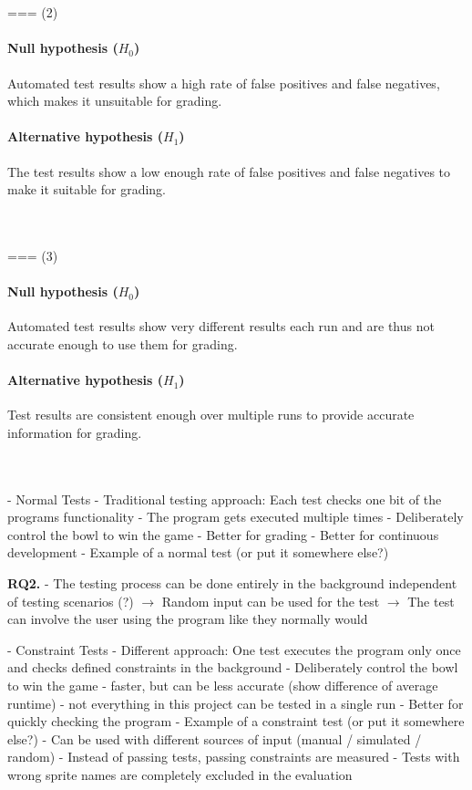 ~\\~\\
=== (2)
\paragraph{Null hypothesis ($H_0$)}
Automated test results show a high rate of false positives and false negatives, which makes it unsuitable for grading.
\paragraph{Alternative hypothesis ($H_1$)}
The test results show a low enough rate of false positives and false negatives to make it suitable for grading.

~\\~\\
=== (3)
\paragraph{Null hypothesis ($H_0$)}
Automated test results show very different results each run and are thus not accurate enough to use them for grading.
\paragraph{Alternative hypothesis ($H_1$)}
Test results are consistent enough over multiple runs to provide accurate information for grading.

~\\~\\
- Normal Tests
    - Traditional testing approach: Each test checks one bit of the programs functionality
    - The program gets executed multiple times
    - Deliberately control the bowl to win the game
    - Better for grading
    - Better for continuous development
    - Example of a normal test (or put it somewhere else?)

\textbf{RQ2.}
- The testing process can be done entirely in the background independent of testing scenarios (?)
    $\rightarrow$ Random input can be used for the test
    $\rightarrow$ The test can involve the user using the program like they normally would

- Constraint Tests
    - Different approach: One test executes the program only once and checks defined constraints in the background
    - Deliberately control the bowl to win the game
    - faster, but can be less accurate (show difference of average runtime)
    - not everything in this project can be tested in a single run
    - Better for quickly checking the program
    - Example of a constraint test (or put it somewhere else?)
    - Can be used with different sources of input (manual / simulated / random)
    - Instead of passing tests, passing constraints are measured
    - Tests with wrong sprite names are completely excluded in the evaluation

